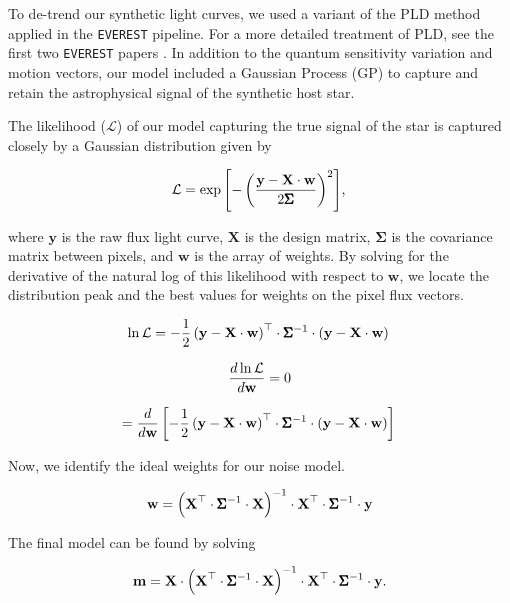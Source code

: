 \documentclass[12pt,preprint]{aastex}
\begin{document}
To de-trend our synthetic light curves, we used a variant of the PLD method applied in the \texttt{EVEREST} pipeline. For a more detailed treatment of PLD, see the first two \texttt{EVEREST} papers \citep{2016AJ....152..100L,2017arXiv170205488L}. In addition to the quantum sensitivity variation and motion vectors, our model included a Gaussian Process (GP) to capture and retain the astrophysical signal of the synthetic host star.

The likelihood ($\mathcal{L}$) of our model capturing the true signal of the star is captured closely by a Gaussian distribution given by

\[
\mathcal{L} = \exp{\left[-\left( \frac{\textbf{y}-\textbf{X}\cdot\textbf{w}}{2\pmb{\Sigma}} \right)^2 \right]}, \\
\]

where $\textbf{y}$ is the raw flux light curve, $\textbf{X}$ is the design matrix, $\pmb{\Sigma}$ is the covariance matrix between pixels, and $\textbf{w}$ is the array of weights. By solving for the derivative of the natural log of this likelihood with respect to $\textbf{w}$, we locate the distribution peak and the best values for weights on the pixel flux vectors.

\[
\ln{\mathcal{L}} = - \frac{1}{2}\left(\textbf{y} - \textbf{X}\cdot\textbf{w} \right)^\top \cdot \pmb{\Sigma}^{-1} \cdot \left(\textbf{y} - \textbf{X}\cdot\textbf{w} \right) \\
\]

\[
\frac{d\ln{\mathcal{L}}}{d \textbf{w}} = 0 \\
\]

\[
=\frac{d}{d \textbf{w}} \left[ - \frac{1}{2} \left(\textbf{y} - \textbf{X}\cdot\textbf{w} \right)^\top \cdot \pmb{\Sigma}^{-1} \cdot \left(\textbf{y} - \textbf{X}\cdot\textbf{w} \right) \right] \\
\]

Now, we identify the ideal weights for our noise model.

\[
\textbf{w} = \left( \textbf{X}^\top \cdot \pmb{\Sigma}^{-1} \cdot \textbf{X} \right)^{-1} \cdot \textbf{X}^\top \cdot \pmb{\Sigma}^{-1} \cdot \textbf{y} \\
\]

The final model can be found by solving

\[
\textbf{m} = \textbf{X} \cdot \left( \textbf{X}^\top \cdot \pmb{\Sigma}^{-1} \cdot \textbf{X} \right)^{-1} \cdot \textbf{X}^\top \cdot \pmb{\Sigma}^{-1} \cdot \textbf{y}. \\
\]
\end{document}
